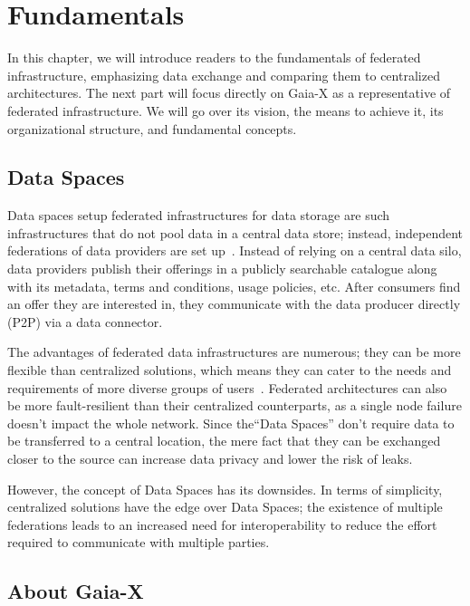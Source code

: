 \chapter{Fundamentals}\label{ch:fundamentals}

\begin{chapterabstract}
    In this chapter, we will introduce readers to the fundamentals of federated infrastructure, emphasizing data exchange and comparing them to centralized architectures.
    The next part will focus directly on Gaia-X as a representative of federated infrastructure.
    We will go over its vision, the means to achieve it, its organizational structure, and fundamental concepts.
\end{chapterabstract}

\section{Data Spaces}\label{sec:federated-data-infrastructures}

Data spaces setup federated infrastructures for data storage are such infrastructures that do not pool data in a central data store; instead, independent federations of data providers are set up~\cite{otto_federated_2022}.
Instead of relying on a central data silo, data providers publish their offerings in a publicly searchable catalogue along with its metadata, terms and conditions, usage policies, etc.
After consumers find an offer they are interested in, they communicate with the data producer directly (P2P) via a data connector.

The advantages of federated data infrastructures are numerous; they can be more flexible than centralized solutions, which means they can cater to the needs and requirements of more diverse groups of users~\cite{raab_federated_2023}.
Federated architectures can also be more fault-resilient than their centralized counterparts, as a single node failure doesn't impact the whole network.
Since the``Data Spaces'' don't require data to be transferred to a central location, the mere fact that they can be exchanged closer to the source can increase data privacy and lower the risk of leaks.

However, the concept of Data Spaces has its downsides.
In terms of simplicity, centralized solutions have the edge over Data Spaces; the existence of multiple federations leads to an increased need for interoperability to reduce the effort required to communicate with multiple parties.

\section{About Gaia-X}\label{sec:about-gaia-x}

